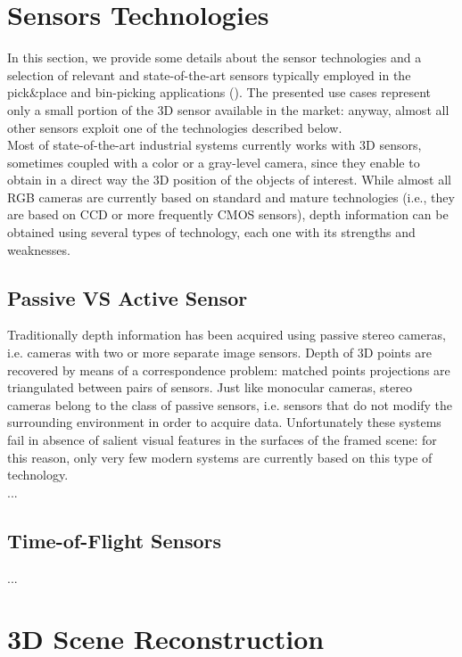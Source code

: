\section{Sensors Technologies}\label{sec:sensor_techs}
In this section, we provide some details about the sensor technologies and a selection of relevant and state-of-the-art sensors typically employed in the pick\&place and bin-picking applications (). The presented use cases represent only a small portion of the 3D sensor available in the market: anyway, almost all other sensors exploit one of the technologies described below.\\
Most of state-of-the-art industrial systems currently works with 3D sensors, sometimes coupled with a color or a gray-level camera, since they enable to obtain in a direct way the 3D position of the objects of interest. While almost all RGB cameras are currently based on standard and mature technologies (i.e., they are based on CCD or more frequently CMOS sensors), depth information can be obtained using several types of technology, each one with its strengths and weaknesses.
\subsection{Passive VS Active Sensor}

Traditionally depth information has been acquired using passive stereo cameras, i.e. cameras with two or more separate image sensors. Depth of 3D points are recovered by means of a correspondence problem: matched points projections are triangulated between pairs of sensors. 
Just like monocular cameras, stereo cameras belong to the class of passive sensors, i.e. sensors that do not modify the surrounding environment in order to acquire data.
Unfortunately these systems fail in absence of salient visual features in the surfaces of the framed scene: for this reason, only very few modern systems are currently based on this type of technology. \\
...\\
\subsection{Time-of-Flight Sensors}
...\\

\section{3D Scene Reconstruction}\label{sec:3dreconstruction}

